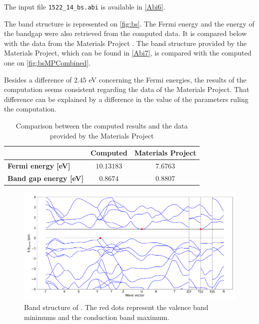\documentclass[11pt,a4paper]{article}
\begin{document}
The input file \texttt{1522\_14\_bs.abi} is available in \autoref{Abi6}. 



The band structure is represented on \autoref{fig:bs}. The Fermi energy and the energy of the bandgap were also retrieved from the computed data. It is compared below with the data from the Materials Project \cite{MaterialsProject}. The band structure provided by the Materials Project, which can be found in \autoref{Abi7}, is compared with the computed one on \autoref{fig:bsMPCombined}.

Besides a difference of $2.45$ eV concerning the Fermi energies, the results of the computation seems consistent regarding the data of the Materials Project. That difference can be explained by a difference in the value of the parameters ruling the computation. 
\begin{table}
\centering
\begin{tabular}{|l|c|c|}
\cline{2-3}
\multicolumn{1}{l|}{}&\textbf{Computed}&\textbf{Materials Project}\\
\hline 
\textbf{Fermi energy [eV]}& $10.13183$&$7.6763$\\
\hline
\textbf{Band gap energy [eV]} & $0.8674$ & $0.8807$ \\
\hline
\end{tabular}
\caption{Comparison between the computed results and the data provided by the Materials Project}
\label{tab:bg}
\end{table}
\begin{figure}[h]
\centering
\includegraphics[width=\textwidth]{images/bs.pdf}
\caption{Band structure of . The red dots represent the valence band minimums and the conduction band maximum.}
\label{fig:bs}
\end{figure}
\end{document}
